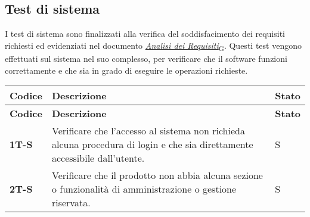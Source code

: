\subsection{Test di sistema}
I test di sistema sono finalizzati alla verifica del soddisfacimento dei requisiti richiesti ed evidenziati nel documento \href{https://7last.github.io/docs/rtb/documentazione-esterna/analisi-dei-requisiti}{\href{https://7last.github.io/docs/pb/documentazione-interna/glossario\#analisi-dei-requisiti}{\textit{Analisi dei Requisiti}\textsubscript{G}}}. Questi test vengono effettuati sul sistema nel suo complesso, per verificare che il software funzioni correttamente e che sia in grado di eseguire le operazioni richieste. \\
\begin{longtable}{|>{\raggedright\arraybackslash}m{}|>{\raggedright\arraybackslash}m{}|>{\raggedright\arraybackslash}m{}|}
	\hline
	\textbf{Codice} & \textbf{Descrizione}                                                                                                                                                                                                                                                                                                                                                                                     & \textbf{Stato} \\
	\hline
	\endfirsthead
	\hline
	\textbf{Codice} & \textbf{Descrizione}                                                                                                                                                                                                                                                                                                                                                                                     & \textbf{Stato} \\
	\endhead
	\textbf{1T-S}   & Verificare che l'accesso al sistema non richieda alcuna procedura di login e che sia direttamente accessibile dall'utente.                                                                                                                                                                                                                                                                               & S              \\
	\hline
	\textbf{2T-S}   & Verificare che il prodotto non abbia alcuna sezione o funzionalità di amministrazione o gestione riservata.                                                                                                                                                                                                                                                                                              & S              \\

\end{longtable}
